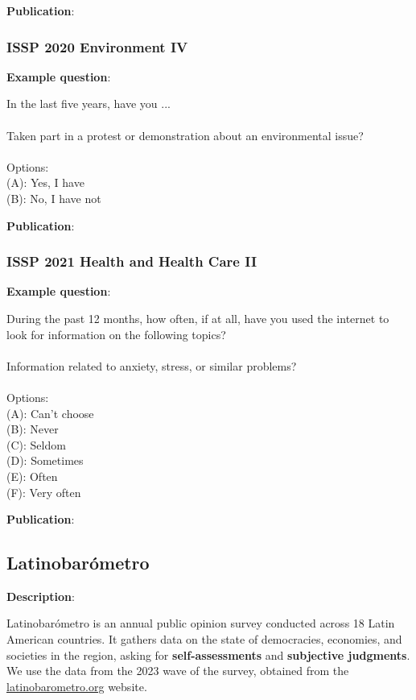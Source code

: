 \documentclass{article} %
\begin{document}
\textbf{Publication}: \cite{issp2019}

\subsubsection{ISSP 2020 Environment IV}

\textbf{Example question}:

\begin{examplebox}
In the last five years, have you ...
\\\\
Taken part in a protest or demonstration about an environmental issue?
\\\\
Options:\\
(A): Yes, I have\\
(B): No, I have not
\end{examplebox}

\textbf{Publication}: \cite{issp2020}

\subsubsection{ISSP 2021 Health and Health Care II}

\textbf{Example question}:

\begin{examplebox}
During the past 12 months, how often, if at all, have you used the internet to look for information on the following topics?
\\\\
Information related to anxiety, stress, or similar problems?
\\\\
Options:\\
(A): Can't choose\\
(B): Never\\
(C): Seldom\\
(D): Sometimes\\
(E): Often\\
(F): Very often
\end{examplebox}

\textbf{Publication}: \cite{issp2021}

\subsection{Latinobarómetro}

\textbf{Description}: 

Latinobarómetro is an annual public opinion survey conducted across 18 Latin American countries. It gathers data on the state of democracies, economies, and societies in the region, asking for \textbf{self-assessments} and \textbf{subjective judgments}.
We use the data from the 2023 wave of the survey, obtained from the \href{https://www.latinobarometro.org}{latinobarometro.org} website.
\end{document}
